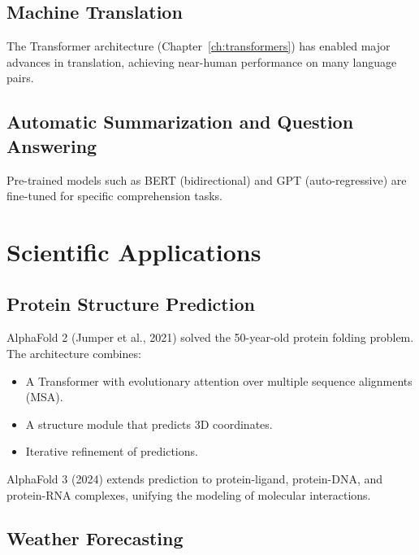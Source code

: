 \subsection{Machine Translation}

The Transformer architecture (Chapter~\ref{ch:transformers}) has enabled major advances in translation, achieving near-human performance on many language pairs.

\subsection{Automatic Summarization and Question Answering}

Pre-trained models such as BERT (bidirectional) and GPT (auto-regressive) are fine-tuned for specific comprehension tasks.

\section{Scientific Applications}
\label{sec:app_science}

\subsection{Protein Structure Prediction}

AlphaFold 2 (Jumper et al., 2021) solved the 50-year-old protein folding problem. The architecture combines:
\begin{itemize}
\item A Transformer with evolutionary attention over multiple sequence alignments (MSA).
\item A structure module that predicts 3D coordinates.
\item Iterative refinement of predictions.
\end{itemize}

\begin{remark}
AlphaFold 3 (2024) extends prediction to protein-ligand, protein-DNA, and protein-RNA complexes, unifying the modeling of molecular interactions.
\end{remark}

\subsection{Weather Forecasting}

